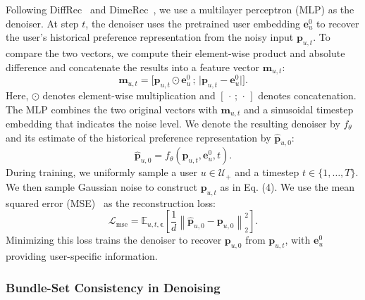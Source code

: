 \documentclass[letterpaper,journal]{IEEEtran}
\begin{document}
Following DiffRec~\cite{wang2023diffrec} and DimeRec~\cite{li2025dimerec}, we use a multilayer perceptron (MLP) as the denoiser. At step $t$, the denoiser uses the pretrained user embedding $\mathbf e_u^0$ to recover the user's historical preference representation from the noisy input $\mathbf p_{u,t}$. To compare the two vectors, we compute their element-wise product and absolute difference and concatenate the results into a feature vector $\mathbf m_{u,t}$:
\begin{equation}
\mathbf m_{u,t}
=\bigl[\mathbf p_{u,t}\odot\mathbf e_u^0\,;\,
\lvert\mathbf p_{u,t}-\mathbf e_u^0\rvert\bigr].
\tag{5}
\end{equation}
Here, $\odot$ denotes element-wise multiplication and $[\,\cdot\,;\,\cdot\,]$ denotes concatenation. The MLP combines the two original vectors with $\mathbf m_{u,t}$ and a sinusoidal timestep embedding that indicates the noise level. We denote the resulting denoiser by $f_\theta$ and its estimate of the historical preference representation by $\widehat{\mathbf p}_{u,0}$:
\begin{equation}
\widehat{\mathbf p}_{u,0}
=f_\theta(\mathbf p_{u,t},\mathbf e_u^0,t).
\tag{6}
\end{equation}
During training, we uniformly sample a user $u\in\mathcal U_+$ and a timestep $t\in\{1,\ldots,T\}$. We then sample Gaussian noise to construct $\mathbf p_{u,t}$ as in Eq. (4). We use the mean squared error (MSE)~\cite{wang2009mse} as the reconstruction loss:
\begin{equation}
\mathcal L_{\mathrm{mse}}
=\mathbb E_{u,t,\boldsymbol\epsilon}
\left[
\frac{1}{d}
\left\|\widehat{\mathbf p}_{u,0}-\mathbf p_{u,0}\right\|_2^2
\right].
\tag{7}
\end{equation}
Minimizing this loss trains the denoiser to recover $\mathbf p_{u,0}$ from $\mathbf p_{u,t}$, with $\mathbf e_u^0$ providing user-specific information.

\subsubsection{Bundle-Set Consistency in Denoising}
\end{document}
